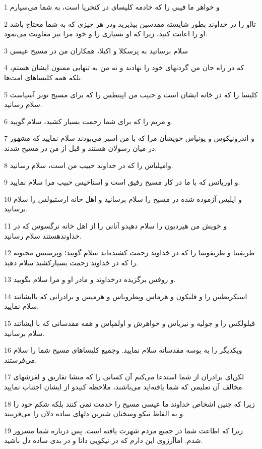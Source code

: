 \par 1 و خواهر ما فیبی را که خادمه کلیسای در کنخریا است، به شما می‌سپارم
\par 2 تااو را در خداوند بطور شایسته مقدسین بپذیرید ودر هر چیزی که به شما محتاج باشد او را اعانت کنید، زیرا که او بسیاری را و خود مرا نیز معاونت می‌نمود.
\par 3 سلام برسانید به پرسکلا و اکیلا، همکاران من در مسیح عیسی
\par 4 که در راه جان من گردنهای خود را نهادند و نه من به تنهایی ممنون ایشان هستم، بلکه همه کلیساهای امت‌ها.
\par 5 کلیسا را که در خانه ایشان است و حبیب من اپینطس را که برای مسیح نوبر آسیاست سلام رسانید.
\par 6 و مریم را که برای شما زحمت بسیار کشید، سلام گویید.
\par 7 و اندرونیکوس و یونیاس خویشان مرا که با من اسیر می‌بودند سلام نمایید که مشهور در میان رسولان هستند و قبل از من در مسیح شدند.
\par 8 وامپلیاس را که در خداوند حبیب من است، سلام رسانید.
\par 9 و اوربانس که با ما در کار مسیح رفیق است و استاخیس حبیب مرا سلام نمایید.
\par 10 و اپلیس آزموده شده در مسیح را سلام برسانید و اهل خانه ارستبولس را سلام برسانید.
\par 11 و خویش من هیردیون را سلام دهیدو آنانی را از اهل خانه نرگسوس که در خداوندهستند سلام رسانید.
\par 12 طریفینا و طریفوسا را که در خداوند زحمت کشیده‌اند سلام گویید؛ وپرسیس محبوبه را که در خداوند زحمت بسیارکشید سلام دهید.
\par 13 و روفس برگزیده درخداوند و مادر او و مرا سلام بگویید.
\par 14 اسنکریطس را و فلیکون و هرماس وپطروباس و هرمیس و برادرانی که باایشانند سلام نمایید.
\par 15 فیلولکس را و جولیه و نیریاس و خواهرش و اولمپاس و همه مقدسانی که با ایشانند سلام برسانید.
\par 16 ویکدیگر را به بوسه مقدسانه سلام نمایید. وجمیع کلیساهای مسیح شما را سلام می‌فرستند.
\par 17 لکن‌ای برادران از شما استدعا می‌کنم آن کسانی را که منشا تفاریق و لغزشهای مخالف آن تعلیمی که شما یافته‌اید می‌باشند، ملاحظه کنیدو از ایشان اجتناب نمایید.
\par 18 زیرا که چنین اشخاص خداوند ما عیسی مسیح را خدمت نمی کنند بلکه شکم خود را و به الفاظ نیکو وسخنان شیرین دلهای ساده دلان را می‌فریبند.
\par 19 زیرا که اطاعت شما در جمیع مردم شهرت یافته است. پس درباره شما مسرور شدم. اماآرزوی این دارم که در نیکویی دانا و در بدی ساده دل باشید.
